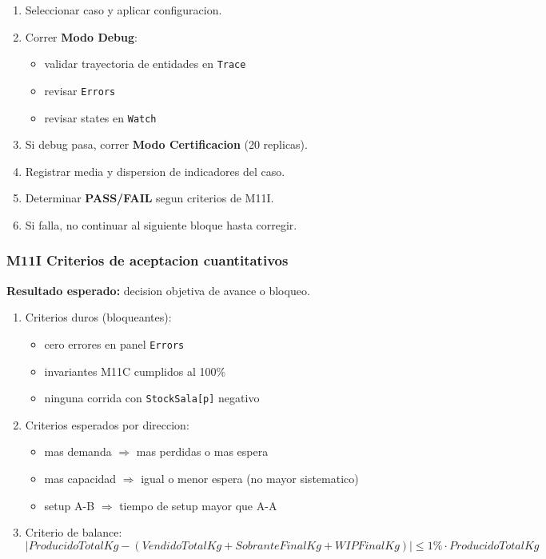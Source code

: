 \documentclass[11pt]{article}
\newcommand{\simio}[1]{\texttt{#1}}
\newcommand{\state}[1]{\texttt{#1}}
\begin{document}
\begin{enumerate}
  \item Seleccionar caso y aplicar configuracion.
  \item Correr \textbf{Modo Debug}:
  \begin{itemize}
    \item validar trayectoria de entidades en \simio{Trace}
    \item revisar \simio{Errors}
    \item revisar states en \simio{Watch}
  \end{itemize}
  \item Si debug pasa, correr \textbf{Modo Certificacion} (20 replicas).
  \item Registrar media y dispersion de indicadores del caso.
  \item Determinar \textbf{PASS/FAIL} segun criterios de M11I.
  \item Si falla, no continuar al siguiente bloque hasta corregir.
\end{enumerate}

\subsubsection{M11I Criterios de aceptacion cuantitativos}
\textbf{Resultado esperado:} decision objetiva de avance o bloqueo.

\begin{enumerate}
  \item Criterios duros (bloqueantes):
  \begin{itemize}
    \item cero errores en panel \simio{Errors}
    \item invariantes M11C cumplidos al 100\%
    \item ninguna corrida con \state{StockSala[p]} negativo
  \end{itemize}
  \item Criterios esperados por direccion:
  \begin{itemize}
    \item mas demanda \(\Rightarrow\) mas perdidas o mas espera
    \item mas capacidad \(\Rightarrow\) igual o menor espera (no mayor sistematico)
    \item setup A-B \(\Rightarrow\) tiempo de setup mayor que A-A
  \end{itemize}
  \item Criterio de balance:
  \[
  \left|
  ProducidoTotalKg - (VendidoTotalKg + SobranteFinalKg + WIPFinalKg)
  \right|
  \le 1\% \cdot ProducidoTotalKg
  \]
\end{enumerate}
\end{document}
